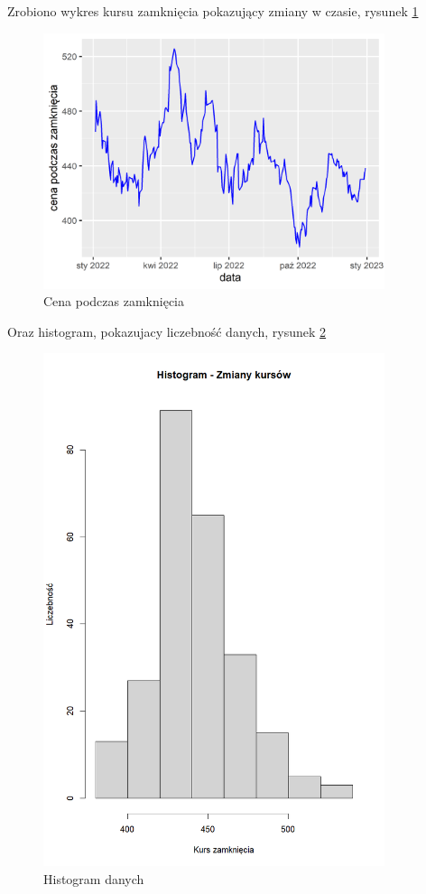 \documentclass[a4paper,11pt]{article}
\begin{document}
Zrobiono wykres  kursu zamknięcia pokazujący zmiany w czasie, rysunek \ref{fig:cena_podcaz_zamkn}

\begin{figure}[h]
  \centering
  \includegraphics[width=10cm]{images/cena_poczas_zamkn.png}
  \caption{Cena podczas zamknięcia}
  \label{fig:cena_podcaz_zamkn}
\end{figure}

Oraz histogram, pokazujacy liczebność danych, rysunek \ref{fig:histogram}
\begin{figure}[h]
  \centering
  \includegraphics[width=10cm]{images/histogram.png}
  \caption{Histogram danych}
  \label{fig:histogram}
\end{figure}
\end{document}

